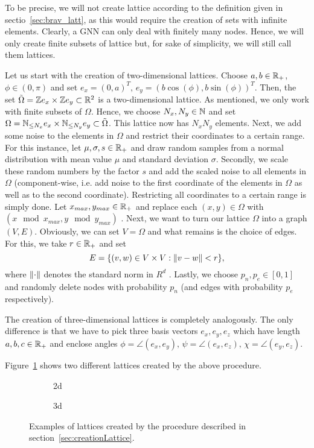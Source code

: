 \label{sec:creationLattice}

To be precise, we will not create lattice according to the definition given in sectio~\ref{sec:brav_latt}, 
as this would require the creation of sets with infinite elements. Clearly, a GNN can only deal with finitely many nodes.
Hence, we will only create finite subsets of lattice but, for sake of simplicity, we will still call them lattices.

Let us start with the creation of two-dimensional lattices.
Choose $a,b\in\mathbb{R}_+$, $\phi\in(0,\pi)$ and set
$e_x=(0,a)^T,\,e_y=(b\cos(\phi), b\sin(\phi))^T$. Then, the set $\tilde{\Omega}=\mathbb{Z} e_x\times\mathbb{Z} e_y\subset\mathbb{R}^2$ is a two-dimensional lattice.
As mentioned, we only work with finite subsets of $\Omega$. Hence, we choose $N_x,N_y\in\mathbb{N}$ and set $\Omega=\mathbb{N}_{\leq N_x}e_x\times\mathbb{N}_{\leq N_y}e_y\subset\tilde{\Omega}$.
This lattice now has $N_xN_y$ elements.
Next, we add some noise to the elements in $\Omega$ and restrict their coordinates to a certain range. For this instance, let $\mu,\sigma,s\in\mathbb{R}_+$ and draw random samples from
a normal distribution with mean value $\mu$ and standard deviation $\sigma$. Secondly, we scale these random numbers by the factor $s$ 
and add the scaled noise to all elements in $\Omega$ (component-wise, i.e. add noise to the first coordinate of the elements in $\Omega$ as well as to the second coordinate).
Restricting all coordinates to a certain range is simply done. Let $x_{max}, y_{max}\in\mathbb{R}_+$ and replace each $(x,y)\in\Omega$ with $(x \mod x_{max}, y \mod y_{max})$ 
.
Next, we want to turn our lattice $\Omega$ into a graph $(V,E)$. Obviously, we can set $V=\Omega$ and what remains is the choice of edges. For this, we take $r\in\mathbb{R}_+$ and set
\begin{equation*}
    E=\{(v, w)\in V\times V: \lVert v-w\rVert<r\},
\end{equation*}
where $\lVert\cdot\rVert$ denotes the standard norm in $R^d$ .
Lastly, we choose $p_n,p_e\in[0,1]$ and randomly delete nodes with probability $p_n$ (and edges with probability $p_e$ respectively).

The creation of three-dimensional lattices is completely analogously. The only difference is that we have to pick three basis vectors $e_x,e_y,e_z$ which have length $a,b,c\in\mathbb{R}_+$ and 
enclose angles $\phi=\angle(e_x, e_y),\,\psi=\angle(e_x,e_z),\,\chi=\angle(e_y,e_z)$. 

Figure~\ref{fig:examplesLattices} shows two different lattices created by the above procedure.

\begin{figure}
    \centering
    \begin{subfigure}[t]{0.4\textwidth}
        \centering
        \caption{2d}
    \end{subfigure}
    \hfill
    \begin{subfigure}[t]{0.4\textwidth}
        \centering
        \caption{3d}
    \end{subfigure}
    \caption{Examples of lattices created by the procedure described in section~\ref{sec:creationLattice}. }
    \label{fig:examplesLattices}
\end{figure}
